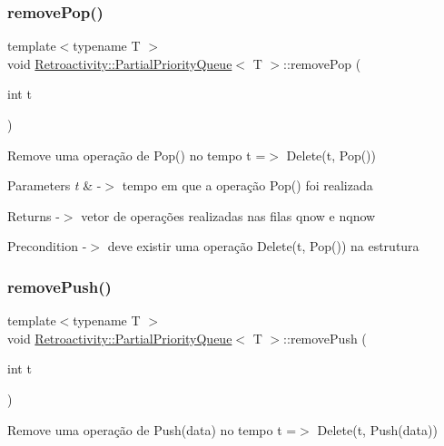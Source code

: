 \subsubsection{\texorpdfstring{remove\+Pop()}{removePop()}}
{\footnotesize\ttfamily template$<$typename T $>$ \\
void \hyperlink{classRetroactivity_1_1PartialPriorityQueue}{Retroactivity\+::\+Partial\+Priority\+Queue}$<$ T $>$\+::remove\+Pop (\begin{DoxyParamCaption}\item[{int}]{t }\end{DoxyParamCaption})}

Remove uma operação de Pop() no tempo t =$>$ Delete(t, Pop())


\begin{DoxyParams}{Parameters}
{\em t} & -\/$>$ tempo em que a operação Pop() foi realizada \\
\hline
\end{DoxyParams}
\begin{DoxyReturn}{Returns}
-\/$>$ vetor de operações realizadas nas filas qnow e nqnow 
\end{DoxyReturn}
\begin{DoxyPrecond}{Precondition}
-\/$>$ deve existir uma operação Delete(t, Pop()) na estrutura 
\end{DoxyPrecond}
\mbox{\label{classRetroactivity_1_1PartialPriorityQueue_a6656a538130dcc2ac9fb25c1c32e1b16}} 
\subsubsection{\texorpdfstring{remove\+Push()}{removePush()}}
{\footnotesize\ttfamily template$<$typename T $>$ \\
void \hyperlink{classRetroactivity_1_1PartialPriorityQueue}{Retroactivity\+::\+Partial\+Priority\+Queue}$<$ T $>$\+::remove\+Push (\begin{DoxyParamCaption}\item[{int}]{t }\end{DoxyParamCaption})}

Remove uma operação de Push(data) no tempo t =$>$ Delete(t, Push(data))


